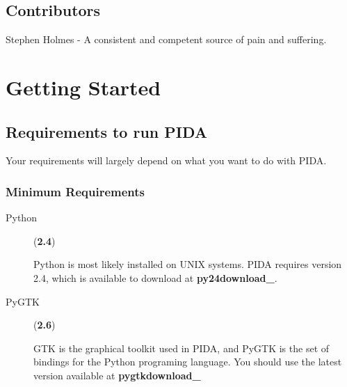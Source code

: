 \documentclass[10pt,a4paper,english]{article}
\begin{document}
\subsection*{Contributors}

Stephen Holmes - A consistent and competent source of pain and suffering.



\hypertarget{getting-started}{}
\section*{Getting Started}



\hypertarget{requirements-to-run-pida}{}
\subsection*{Requirements to run PIDA}

Your requirements will largely depend on what you want to do with PIDA.



\hypertarget{minimum-requirements}{}
\subsubsection*{Minimum Requirements}
\begin{description}
\item[Python] (\textbf{2.4})

Python is most likely installed on UNIX systems. PIDA requires version 2.4,
which is available to download at {\color{red}\bfseries{}py24download{\_}}.

\item[PyGTK] (\textbf{2.6})

GTK is the graphical toolkit used in PIDA, and PyGTK is the set of bindings
for the Python programing language. You should use the latest version
available at {\color{red}\bfseries{}pygtkdownload{\_}}

\end{description}
\end{document}
